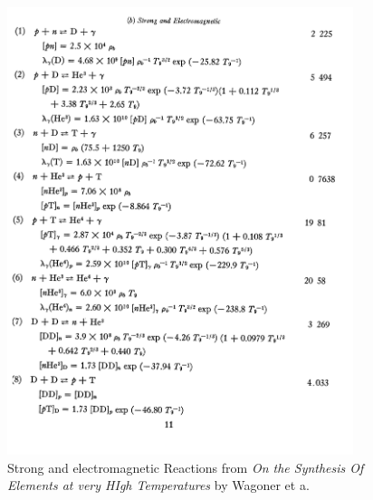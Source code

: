 \documentclass[twoside]{article}
\begin{document}
\begin{figure}[h!]
  \centering
      \includegraphics[width=0.9\textwidth]{eqs1.pdf}
  \caption{Strong and electromagnetic Reactions from \emph{On the Synthesis Of Elements at very HIgh Temperatures} by Wagoner et a. }\label{f:reactions}
\end{figure}
\end{document}
